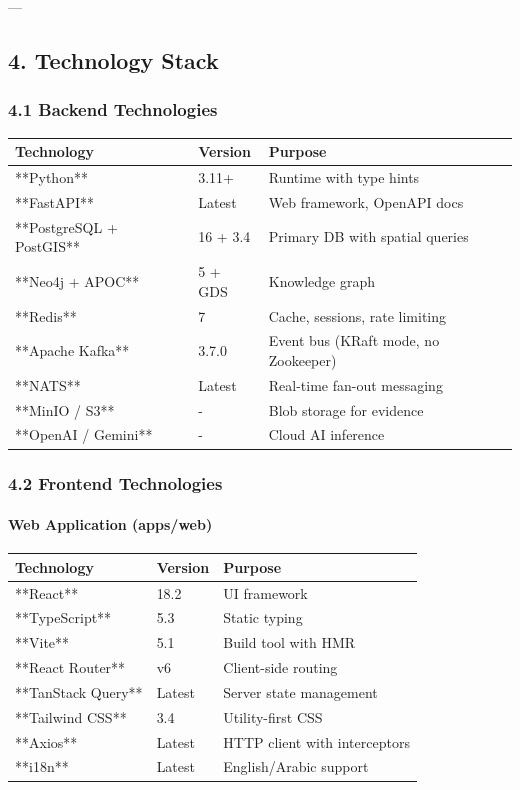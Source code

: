 \documentclass[11pt,a4paper]{article}
\begin{document}
---

\subsection{4. Technology Stack}

\subsubsection{4.1 Backend Technologies}

\begin{table}[H]
\centering
\begin{tabular}{|l|l|l|}
\hline
Technology & Version & Purpose \\
\hline
**Python** & 3.11+ & Runtime with type hints \\
\hline
**FastAPI** & Latest & Web framework, OpenAPI docs \\
\hline
**PostgreSQL + PostGIS** & 16 + 3.4 & Primary DB with spatial queries \\
\hline
**Neo4j + APOC** & 5 + GDS & Knowledge graph \\
\hline
**Redis** & 7 & Cache, sessions, rate limiting \\
\hline
**Apache Kafka** & 3.7.0 & Event bus (KRaft mode, no Zookeeper) \\
\hline
**NATS** & Latest & Real-time fan-out messaging \\
\hline
**MinIO / S3** & - & Blob storage for evidence \\
\hline
**OpenAI / Gemini** & - & Cloud AI inference \\
\hline
\end{tabular}
\end{table}

\subsubsection{4.2 Frontend Technologies}

\paragraph{Web Application (apps/web)}

\begin{table}[H]
\centering
\begin{tabular}{|l|l|l|}
\hline
Technology & Version & Purpose \\
\hline
**React** & 18.2 & UI framework \\
\hline
**TypeScript** & 5.3 & Static typing \\
\hline
**Vite** & 5.1 & Build tool with HMR \\
\hline
**React Router** & v6 & Client-side routing \\
\hline
**TanStack Query** & Latest & Server state management \\
\hline
**Tailwind CSS** & 3.4 & Utility-first CSS \\
\hline
**Axios** & Latest & HTTP client with interceptors \\
\hline
**i18n** & Latest & English/Arabic support \\
\hline
\end{tabular}
\end{table}
\end{document}
